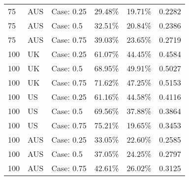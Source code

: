 \begin{table}[ht]
\begin{tabular}{llllll}
  75 & AUS & Case: 0.25 & 29.48\% & 19.71\% & 0.2282 \\ 
  75 & AUS & Case: 0.5 & 32.51\% & 20.84\% & 0.2386 \\ 
  75 & AUS & Case: 0.75 & 39.03\% & 23.65\% & 0.2719 \\ 
  100 & UK & Case: 0.25 & 61.07\% & 44.45\% & 0.4584 \\ 
  100 & UK & Case: 0.5 & 68.95\% & 49.91\% & 0.5027 \\ 
  100 & UK & Case: 0.75 & 71.62\% & 47.25\% & 0.5153 \\ 
  100 & US & Case: 0.25 & 61.16\% & 44.58\% & 0.4116 \\ 
  100 & US & Case: 0.5 & 69.56\% & 37.88\% & 0.3864 \\ 
  100 & US & Case: 0.75 & 75.21\% & 19.65\% & 0.3453 \\ 
  100 & AUS & Case: 0.25 & 33.05\% & 22.60\% & 0.2585 \\ 
  100 & AUS & Case: 0.5 & 37.05\% & 24.25\% & 0.2797 \\ 
  100 & AUS & Case: 0.75 & 42.61\% & 26.02\% & 0.3125 \\ 
   \hline
\end{tabular}
\end{table}

